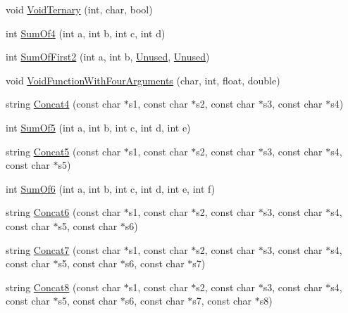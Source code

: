 \begin{DoxyCompactItemize}
\item 
void \hyperlink{namespacetesting_1_1gmock__more__actions__test_ac41b49dc8ab365ccad7b332796421cd4}{Void\+Ternary} (int, char, bool)
\item 
int \hyperlink{namespacetesting_1_1gmock__more__actions__test_a41c348fff8608825239a276b8426a475}{Sum\+Of4} (int a, int b, int c, int d)
\item 
int \hyperlink{namespacetesting_1_1gmock__more__actions__test_aaa60ddffb96ddc3a73b0b22929ca5bec}{Sum\+Of\+First2} (int a, int b, \hyperlink{namespacetesting_a603e329ec0263ebfcf16f712810bd511}{Unused}, \hyperlink{namespacetesting_a603e329ec0263ebfcf16f712810bd511}{Unused})
\item 
void \hyperlink{namespacetesting_1_1gmock__more__actions__test_a8c952be61635486e84c1eca3bf3acd9b}{Void\+Function\+With\+Four\+Arguments} (char, int, float, double)
\item 
string \hyperlink{namespacetesting_1_1gmock__more__actions__test_aa423cedcbd858249b616f0c537a1e4cf}{Concat4} (const char $\ast$s1, const char $\ast$s2, const char $\ast$s3, const char $\ast$s4)
\item 
int \hyperlink{namespacetesting_1_1gmock__more__actions__test_a38e64569bf08e83c6db22c1fb0fe0af6}{Sum\+Of5} (int a, int b, int c, int d, int e)
\item 
string \hyperlink{namespacetesting_1_1gmock__more__actions__test_a2ac9917d1aa19cd7ac32bba837f4eacc}{Concat5} (const char $\ast$s1, const char $\ast$s2, const char $\ast$s3, const char $\ast$s4, const char $\ast$s5)
\item 
int \hyperlink{namespacetesting_1_1gmock__more__actions__test_a139632d344348fdfa25111d4e43f70ba}{Sum\+Of6} (int a, int b, int c, int d, int e, int f)
\item 
string \hyperlink{namespacetesting_1_1gmock__more__actions__test_a4de188277a85d007de0aa6e8dc364b75}{Concat6} (const char $\ast$s1, const char $\ast$s2, const char $\ast$s3, const char $\ast$s4, const char $\ast$s5, const char $\ast$s6)
\item 
string \hyperlink{namespacetesting_1_1gmock__more__actions__test_a5628f71ebb5ae61a6e56396145a76da4}{Concat7} (const char $\ast$s1, const char $\ast$s2, const char $\ast$s3, const char $\ast$s4, const char $\ast$s5, const char $\ast$s6, const char $\ast$s7)
\item 
string \hyperlink{namespacetesting_1_1gmock__more__actions__test_a122e4affe78745eef3dd748e88bd248c}{Concat8} (const char $\ast$s1, const char $\ast$s2, const char $\ast$s3, const char $\ast$s4, const char $\ast$s5, const char $\ast$s6, const char $\ast$s7, const char $\ast$s8)

\end{DoxyCompactItemize}
